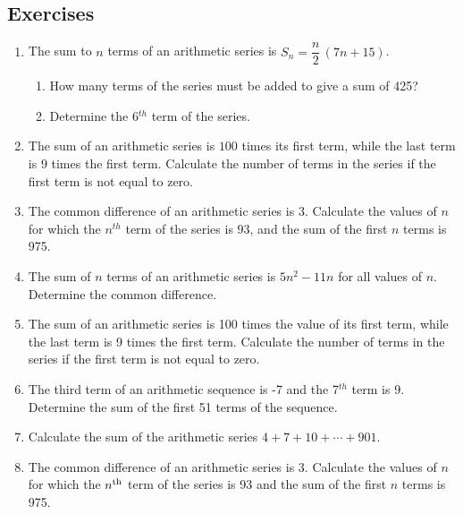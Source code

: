 \subsection{Exercises}
\begin{enumerate}

\item The sum to $n$ terms of an arithmetic series is $S_n = \dfrac{n}{2} \, (7n + 15)$.
\begin{enumerate}
\item{How many terms of the series must be added to give a sum of 425?}
\item{Determine the 6$^{th}$ term of the series.}
\end{enumerate}

\item The sum of an arithmetic series is $100$ times its first term, while the last term is $9$ times the first term. Calculate the number of terms in the series if the first term is not equal to zero.

\item The common difference of an arithmetic series is $3$. Calculate the values of $n$ for which the $n^{th}$ term of the series is $93$, and the sum of the first $n$ terms is 975.

\item The sum of $n$ terms of an arithmetic series is $5n^2 - 11n$ for all values of $n$. Determine the common difference.

\item{The sum of an arithmetic series is 100 times the value of its first term, while the last term is 9 times the first term. Calculate the number of terms in the series if the first term is not equal to zero.}

\item{The third term of an arithmetic sequence is -7 and the 7$^{th}$ term is 9. Determine the sum of the first 51 terms of the sequence.}

\item{Calculate the sum of the arithmetic series $4+7+10+\cdots+901$.}
\item{ The common difference of an arithmetic series is 3. Calculate the values of $n$ for which the $n^{\rm{th}}$ term of the series is 93 and the sum of the first $n$ terms is 975.}
\end{enumerate}

